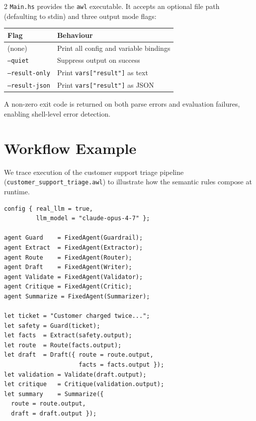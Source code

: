 \documentclass[10pt]{article}
\begin{document}
\begin{multicols}{2}
\texttt{Main.hs} provides the \texttt{awl} executable.  It accepts an
optional file path (defaulting to stdin) and three output mode flags:

\begin{center}
\small
\begin{tabular}{ll}
\toprule
Flag & Behaviour \\
\midrule
(none)            & Print all config and variable bindings \\
\texttt{--quiet}        & Suppress output on success \\
\texttt{--result-only}  & Print \texttt{vars["result"]} as text \\
\texttt{--result-json}  & Print \texttt{vars["result"]} as JSON \\
\bottomrule
\end{tabular}
\end{center}

A non-zero exit code is returned on both parse errors and evaluation
failures, enabling shell-level error detection.

\section{Workflow Example}
\label{sec:workflow}

We trace execution of the customer support triage pipeline
(\texttt{customer\_support\_triage.awl}) to illustrate how the semantic
rules compose at runtime.

\begin{lstlisting}[style=awl,
    caption={Customer support triage (abridged)}]
config { real_llm = true,
         llm_model = "claude-opus-4-7" };

agent Guard    = FixedAgent(Guardrail);
agent Extract  = FixedAgent(Extractor);
agent Route    = FixedAgent(Router);
agent Draft    = FixedAgent(Writer);
agent Validate = FixedAgent(Validator);
agent Critique = FixedAgent(Critic);
agent Summarize = FixedAgent(Summarizer);

let ticket = "Customer charged twice...";
let safety = Guard(ticket);
let facts  = Extract(safety.output);
let route  = Route(facts.output);
let draft  = Draft({ route = route.output,
                     facts = facts.output });
let validation = Validate(draft.output);
let critique   = Critique(validation.output);
let summary    = Summarize({
  route = route.output,
  draft = draft.output });


\end{lstlisting}
\end{multicols}
\end{document}
